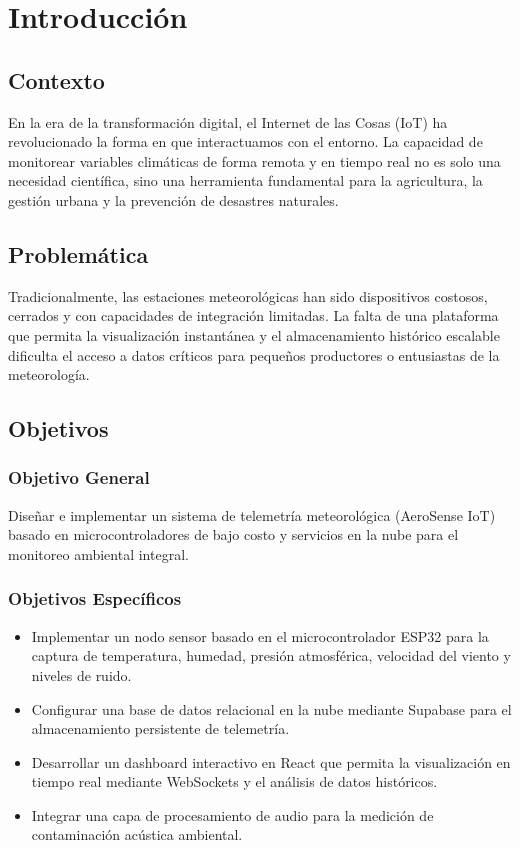\chapter{Introducción}

\section{Contexto}
En la era de la transformación digital, el Internet de las Cosas (IoT) ha revolucionado la forma en que interactuamos con el entorno. La capacidad de monitorear variables climáticas de forma remota y en tiempo real no es solo una necesidad científica, sino una herramienta fundamental para la agricultura, la gestión urbana y la prevención de desastres naturales. 

\section{Problemática}
Tradicionalmente, las estaciones meteorológicas han sido dispositivos costosos, cerrados y con capacidades de integración limitadas. La falta de una plataforma que permita la visualización instantánea y el almacenamiento histórico escalable dificulta el acceso a datos críticos para pequeños productores o entusiastas de la meteorología.

\section{Objetivos}

\subsection{Objetivo General}
Diseñar e implementar un sistema de telemetría meteorológica (AeroSense IoT) basado en microcontroladores de bajo costo y servicios en la nube para el monitoreo ambiental integral.

\subsection{Objetivos Específicos}
\begin{itemize}
    \item Implementar un nodo sensor basado en el microcontrolador ESP32 para la captura de temperatura, humedad, presión atmosférica, velocidad del viento y niveles de ruido.
    \item Configurar una base de datos relacional en la nube mediante Supabase para el almacenamiento persistente de telemetría.
    \item Desarrollar un dashboard interactivo en React que permita la visualización en tiempo real mediante WebSockets y el análisis de datos históricos.
    \item Integrar una capa de procesamiento de audio para la medición de contaminación acústica ambiental.
\end{itemize}
